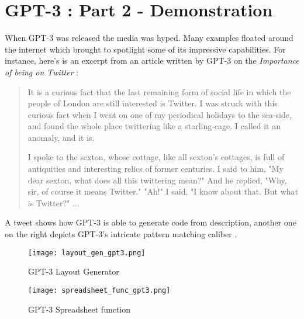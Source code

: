 \chapter*{GPT-3 : Part 2 - Demonstration}
\label{chap:demonstration}
\thispagestyle{fancy}

\hspace{0.5cm} When GPT-3 was released the media was hyped. Many examples floated around the internet which brought to spotlight some of its impressive capabilities. For instance, here's is an excerpt from an article written by GPT-3 on the \emph{Importance of being on Twitter} \cite{mitrvw:nlmsgcm}:

\begin{quote}
    It is a curious fact that the last remaining form of social life in which the people of London are still interested is Twitter. I was struck with this curious fact when I went on one of my periodical holidays to the sea-side, and found the whole place twittering like a starling-cage. I called it an anomaly, and it is.
    
    I spoke to the sexton, whose cottage, like all sexton's cottages, is full of antiquities and interesting relics of former centuries. I said to him, "My dear sexton, what does all this twittering mean?" And he replied, "Why, sir, of course it means Twitter." "Ah!" I said, "I know about that. But what is Twitter?" ...
\end{quote}

A tweet shows how GPT-3 is able to generate code from description, another one on the right depicts GPT-3's intricate pattern matching caliber \cite{twt:1282676454690451457} \cite{twt:1285410751092416513}.

\begin{figure}[!htbp]
    \centering
    \begin{minipage}{0.45\textwidth}
        \centering
        \texttt{[image: layout\_gen\_gpt3.png]}
        \caption[GPT-3 Layout Generator]{\centering GPT-3 Layout Generator}
        \label{fig:lytgen}
    \end{minipage}\hfill
    \begin{minipage}{0.45\textwidth}
        \centering
        \texttt{[image: spreadsheet\_func\_gpt3.png]}
        \caption[GPT-3 Spreadsheet function]{\centering GPT-3 Spreadsheet function}
        \label{fig:spsfnc}
    \end{minipage}
\end{figure}

\vspace*{\fill}